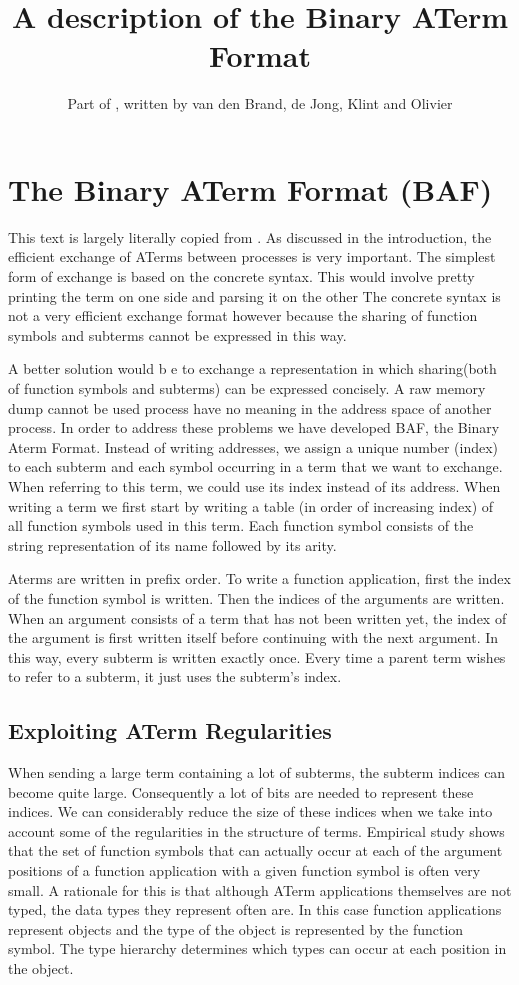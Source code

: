\documentclass{article}
\title{A description of the Binary ATerm Format}
\author{Part of \cite{BJKO99}, written by van den Brand, de Jong, Klint and Olivier}
\date{}
\begin{document}
\maketitle
\section{The Binary ATerm Format (BAF)}
This text is largely literally copied from \cite{BJKO99}.
As discussed in the introduction, the efficient exchange of ATerms between processes is very important.  
The simplest form of exchange is based on the concrete syntax.
This would involve pretty printing the term on one side  and parsing it on the other  
The concrete syntax is not a very efficient exchange format however  because the sharing of function symbols and 
subterms cannot be expressed in this way.

A better solution would b e to exchange a representation in which sharing(both of function symbols and subterms) can be expressed concisely. 
A raw memory dump cannot be used  process have no meaning in the address space of another process.
In order to address these problems we have developed BAF, the Binary Aterm Format. Instead of writing addresses, we assign a unique number
(index) to each subterm and each symbol occurring in a term that we want to exchange.  
When referring to this term, we could use its index instead of its address.
When writing a term  we first start by writing a table 
(in order of increasing index) of all function symbols used in this term. 
Each function symbol consists of the string representation of its name followed by its arity.

Aterms are written in prefix order. To write a function application, first the index of the function symbol
is written. Then the indices of the arguments are written. When an argument consists of a term that has not been 
written yet, the index of the argument is first written itself before continuing with the next argument. In this way,
every subterm is written exactly once. Every time a parent term wishes to refer to a subterm, it just 
uses the subterm's index.

\subsection{Exploiting ATerm Regularities}
When sending a large term containing a lot of subterms, the subterm indices can become quite large. 
Consequently a lot of bits are needed to represent these indices. 
We can considerably reduce the size of these indices when we take into account some of the regularities in the 
structure of terms. Empirical study shows that the set of function symbols that can actually occur at each 
of the argument positions of a function application with a given function symbol is often very small. 
A rationale for this is that although ATerm applications themselves are not typed, 
the data types they represent often are. 
In this case  function applications represent objects and the type of the object is represented 
by the function symbol. The type hierarchy determines which types can occur at each position in the object.
\end{document}
